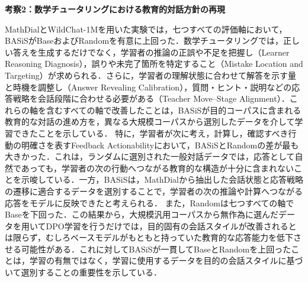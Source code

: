 \documentclass[manuscript,review,anonymous]{acmart}
\begin{document}
\noindent\textbf{考察2：数学チュータリングにおける教育的対話方針の再現}\par
MathDialとWildChat-1Mを用いた実験では，七つすべての評価軸において，BASiSがBaseおよびRandomを有意に上回った．数学チュータリングでは，正しい答えを生成するだけでなく，学習者の推論の正誤や不足を把握し（Learner Reasoning Diagnosis），誤りや未完了箇所を特定すること（Mistake Location and Targeting）が求められる．さらに，学習者の理解状態に合わせて解答を示す量と時機を調整し（Answer Revealing Calibration），質問・ヒント・説明などの応答戦略を会話段階に合わせる必要がある（Teacher Move--Stage Alignment）．これらの軸を含むすべての軸で改善したことは，BASiSが目的コーパスに含まれる教育的な対話の進め方を，異なる大規模コーパスから選別したデータを介して学習できたことを示している．
特に，学習者が次に考え，計算し，確認すべき行動の明確さを表すFeedback Actionabilityにおいて，BASiSとRandomの差が最も大きかった．これは，ランダムに選別された一般対話データでは，応答として自然であっても，学習者の次の行動へつながる教育的な構造が十分に含まれないことを示唆している．一方，BASiSは，MathDialから抽出した会話状態と応答戦略の遷移に適合するデータを選別することで，学習者の次の推論や計算へつながる応答をモデルに反映できたと考えられる．
また，Randomは七つすべての軸でBaseを下回った．この結果から，大規模汎用コーパスから無作為に選んだデータを用いてDPO学習を行うだけでは，目的固有の会話スタイルが改善されるとは限らず，むしろベースモデルがもともと持っていた教育的な応答能力を低下させる可能性がある．これに対してBASiSが一貫してBaseとRandomを上回ったことは，学習の有無ではなく，学習に使用するデータを目的の会話スタイルに基づいて選別することの重要性を示している．
\end{document}
